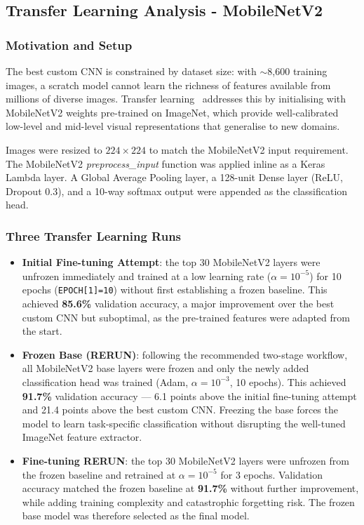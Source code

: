 \documentclass[a4paper,11pt]{article}
\begin{document}
\subsection{Transfer Learning Analysis - MobileNetV2}
\subsubsection{Motivation and Setup}
The best custom CNN is constrained by dataset size: with $\sim$8,600 training images, a scratch model cannot learn the richness of features available from millions of diverse images. Transfer learning~\cite{pan2009survey} addresses this by initialising with MobileNetV2 weights pre-trained on ImageNet, which provide well-calibrated low-level and mid-level visual representations that generalise to new domains.
 
Images were resized to $224\times224$ to match the MobileNetV2 input requirement. The MobileNetV2 \textit{preprocess\_input} function was applied inline as a Keras Lambda layer. A Global Average Pooling layer, a 128-unit Dense layer (ReLU, Dropout 0.3), and a 10-way softmax output were appended as the classification head.
 
\subsubsection{Three Transfer Learning Runs}
\begin{itemize}
    \item \textbf{Initial Fine-tuning Attempt}: the top 30 MobileNetV2 layers were unfrozen immediately and trained at a low learning rate ($\alpha = 10^{-5}$) for 10 epochs (\texttt{EPOCH[1]=10}) without first establishing a frozen baseline. This achieved \textbf{85.6\%} validation accuracy, a major improvement over the best custom CNN but suboptimal, as the pre-trained features were adapted from the start.
 
    \item \textbf{Frozen Base (RERUN)}: following the recommended two-stage workflow, all MobileNetV2 base layers were frozen and only the newly added classification head was trained (Adam, $\alpha = 10^{-3}$, 10 epochs). This achieved \textbf{91.7\%} validation accuracy — 6.1 points above the initial fine-tuning attempt and 21.4 points above the best custom CNN. Freezing the base forces the model to learn task-specific classification without disrupting the well-tuned ImageNet feature extractor.
 
    \item \textbf{Fine-tuning RERUN}: the top 30 MobileNetV2 layers were unfrozen from the frozen baseline and retrained at $\alpha = 10^{-5}$ for 3 epochs. Validation accuracy matched the frozen baseline at \textbf{91.7\%} without further improvement,
    while adding training complexity and catastrophic forgetting risk. The frozen base model was therefore selected as the final model.
\end{itemize}
\end{document}
